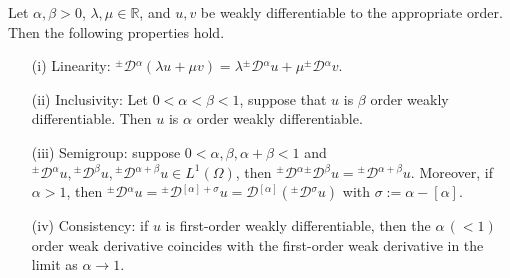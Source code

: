 \documentclass[leqno,final]{siamltex}
\numberwithin{equation}{section}
\renewcommand{\(}{\bigl(}
\renewcommand{\)}{\bigr)}
\newcommand{\R}{\mathbb{R}}
\begin{document}
    \begin{proposition} \label{properties}
    	Let  $\alpha , \beta >0$, $\lambda ,\mu \in \R$, and $u,v$ be weakly differentiable to the appropriate order. Then the following properties hold.  
    \begin{itemize}
    \item[{\rm(i)}] Linearity: ${^{\pm}}{\mathcal{D}}{^{\alpha}}(\lambda u + \mu v) = \lambda {^{\pm}}{\mathcal{D}}{^{\alpha}} u + \mu {^{\pm}}{\mathcal{D}}{^{\alpha}} v$.
    \item[{\rm (ii)}] Inclusivity: Let $0 < \alpha < \beta < 1$, suppose that $u$ is $\beta$ order weakly differentiable. Then $u$ is $\alpha$ order weakly differentiable.    
     \item[{\rm (iii)}] Semigroup:  suppose $ 0<\alpha, \beta, \alpha+\beta<1$ and 
    ${^{\pm}}{\mathcal{D}}{^{\alpha}} u, {^{\pm}}{\mathcal{D}}{^{\beta}} u, {^{\pm}}{\mathcal{D}}{^{\alpha+\beta}} u\in L^1(\Omega)$, then ${^{\pm}}{\mathcal{D}}{^{\alpha}} {^{\pm}}{\mathcal{D}}{^{\beta}} u = {^{\pm}}{\mathcal{D}}{^{\alpha+\beta}} u$. Moreover, if $\alpha>1$, then  ${^{\pm}}{\mathcal{D}}{^{\alpha}} u
    ={^{\pm}}{\mathcal{D}}{^{[\alpha]+\sigma}} u=  {\mathcal{D}}{^{[\alpha]}} ({^{\pm}}{\mathcal{D}}{^{\sigma}} u)$ with $\sigma:=\alpha- [\alpha]$.
    \item[{\rm (iv)}] Consistency: if $u$ is first-order weakly differentiable, then the $\alpha\, (<1)$ order weak derivative coincides with the first-order weak derivative in the limit as $\alpha\to 1$.
  
    \end{itemize}
    \end{proposition}
    
\end{document}

